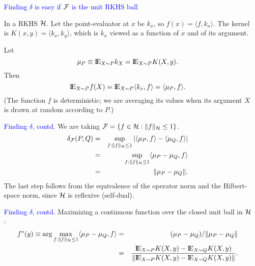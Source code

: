 \documentclass[landscape]{slides}
\newcommand{\EE}{\hbox{I\kern-.1667em\hbox{E}}}
\newcommand{\cF}{{\cal F}}
\newcommand{\cH}{{\cal H}}
\newcommand{\beq}{\begin{equation}}
\newcommand{\eeq}{\end{equation}}
\begin{document}
\begin{slide}
\begin{slide}
\end{slide}

\begin{slide}
{\textcolor{blue}{Finding $\delta$ is easy if $\cF$ is the unit RKHS ball}}

In a RKHS $\cH$.
Let the point-evaluator at $x$ be $k_x$, so $f(x) = \langle f, k_x \rangle$.
The kernel is $K(x, y)= \langle k_x, k_y \rangle$,
which is $k_x$ viewed as a function of $x$ and of its
argument.

Let 
\beq
    \mu_P \equiv \EE_{X \sim P} k_X = \EE_{X \sim P} K(X, y).
\eeq
Then
\beq
   \EE_{X \sim P} f(X) = \EE_{X \sim P} \langle k_x, f \rangle = \langle \mu_P, f \rangle.
\eeq
(The function $f$ is deterministic; we are averaging its values when its argument $X$
is drawn at random according to $P$.)

\end{slide}

\begin{slide}
{\textcolor{blue}{Finding $\delta$, contd.}}
We are taking $\cF = \{ f \in \cH : \| f \|_\cH \le 1 \}$.
\begin{eqnarray}
   \delta_\cF(P, Q) & = & 
          \sup_{f: \|f \|_\cH \le 1} | \langle \mu_P, f \rangle - \langle \mu_Q, f \rangle |
          \nonumber \\
    & = & \sup_{f: \|f \|_\cH \le 1} \langle \mu_P - \mu_Q , f \rangle 
          \nonumber \\
    & = & \| \mu_P - \mu_Q \|.
\end{eqnarray}
The last step follows from the equivalence of the operator norm 
and the Hilbert-space norm, since $\cH$ is reflexive (self-dual).

\end{slide}

\begin{slide}
{\textcolor{blue}{Finding $\delta$, contd.}}
Maximizing a continuous function over the closed unit ball in $\cH$:
\begin{eqnarray}
 f^*(y) \equiv  \arg \max_{f : \|f \|_\cH \le 1 } \langle \mu_P - \mu_Q , f \rangle 
        & = & (\mu_P - \mu_Q)/\|\mu_P - \mu_Q \| \nonumber \\
        & = & 
           \frac{\EE_{X \sim P} K(X, y) - \EE_{X \sim Q} K(X, y)}
                  {\|\EE_{X \sim P} K(X, y) - \EE_{X \sim Q} K(X, y)\|}.
\end{eqnarray}


\end{slide}
\end{slide}
\end{document}
